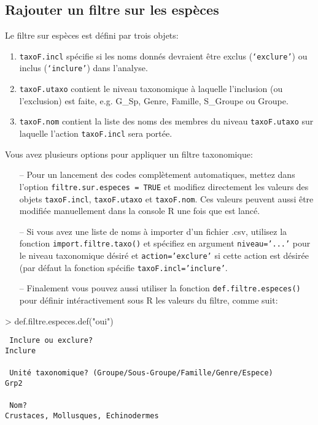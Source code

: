 \documentclass{article}
\begin{document}
\subsection{Rajouter un filtre sur les espèces}
\label{filtre::sp}
Le filtre sur espèces est défini par trois objets:

\begin{enumerate}
  \item \texttt{taxoF.incl} spécifie si les noms donnés devraient être
    exclus (\texttt{`exclure'}) ou inclus (\texttt{`inclure'}) dans
    l'analyse.
  \item \texttt{taxoF.utaxo} contient le niveau taxonomique à laquelle
    l'inclusion (ou l'exclusion) est faite, e.g. G\_Sp, Genre,
    Famille, S\_Groupe ou Groupe.
   \item \texttt{taxoF.nom} contient la liste des noms des membres du
     niveau \texttt{taxoF.utaxo} sur laquelle l'action
     \texttt{taxoF.incl} sera portée.
\end{enumerate}

Vous avez plusieurs options pour appliquer un filtre taxonomique:
\begin{itemize}
\item[--] Pour un lancement des codes complètement automatiques, mettez dans
\mcode l'option \texttt{filtre.sur.especes =  TRUE} et modifiez
directement les valeurs des objets
\texttt{taxoF.incl}, \texttt{taxoF.utaxo} et \texttt{taxoF.nom}. Ces
valeurs peuvent aussi être modifiée manuellement dans la console R une
fois que \mcode{} est lancé.
\item[--] \label{impFtaxo}Si vous avez une liste de noms à importer
d'un fichier .csv, utilisez la fonction \texttt{import.filtre.taxo()}
et spécifiez en argument \texttt{niveau='...'} pour le niveau
taxonomique désiré et \texttt{action='exclure'} si cette action est
désirée (par défaut la fonction spécifie
\texttt{taxoF.incl='inclure'}.
\item[--] Finalement vous pouvez aussi utiliser
la fonction \texttt{def.filtre.especes()} pour définir intéractivement
sous R les valeurs du filtre, comme suit:
\end{itemize}
\begin{Schunk}
\begin{Sinput}
> def.filtre.especes.def("oui")
\end{Sinput}
\end{Schunk}

\texttt{\color{MidnightBlue} Inclure ou exclure? } \\
\indent \indent \texttt{Inclure } \\
\\
\indent \texttt{\color{MidnightBlue} Unité taxonomique? (Groupe/Sous-Groupe/Famille/Genre/Espece)} \\
\indent \indent \texttt{Grp2}\\
\\
\indent \texttt{\color{MidnightBlue} Nom?} \\
\indent \indent \texttt{Crustaces, Mollusques, Echinodermes}\\
\\
\end{document}
